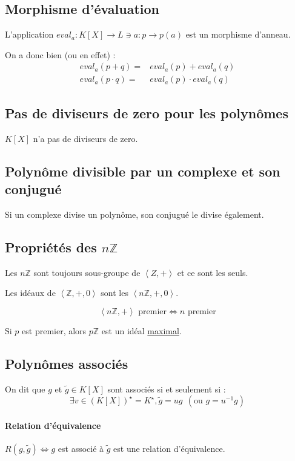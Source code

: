 \documentclass[a4paper,10pt]{article}
\newcommand{\ap}{ \rightarrow} %
\newcommand{\mt}[1]{\widetilde{ #1 }} %
\newcommand{\grp}[1]{\left\langle #1 \right\rangle} %
\newcommand{\ioi}{\Leftrightarrow} %
\newcommand{\ZZ}{\mathbb{Z}} %
\begin{document}
 \subsection{Morphisme d'évaluation}
  L'application $eval_a : K[X] \ap L \ni a : p \ap p(a)$ est un morphisme d'anneau.
  
  On a donc bien (ou en effet) : 
  \begin{eqnarray*}
   eval_a(p+q)=&eval_a(p)+eval_a(q)\\
   eval_a(p\cdot q)=&eval_a(p)\cdot eval_a(q)
   \end{eqnarray*}

 \subsection{Pas de diviseurs de zero pour les polynômes}
  $K[X]$ n'a pas de diviseurs de zero.

 \subsection{Polynôme divisible par un complexe et son conjugué}
   Si un complexe divise un polynôme, son conjugué le divise également.

 \subsection{Propriétés des $n\ZZ$}
  Les $n\ZZ$ sont toujours sous-groupe de $\grp{Z,+}$ et ce sont les seuls.
  
  Les idéaux de $\grp{\ZZ,+,0}$ sont les $\grp{n\ZZ,+,0}$.

  $$\grp{n\ZZ,+} \mbox{ premier} \ioi n \mbox{ premier}$$

  Si $p$ est premier, alors $p\ZZ$ est un idéal \underline{maximal}. 

 \subsection{Polynômes associés}
  On dit que $g$ et $\mt{g} \in K[X]$ sont associés si et seulement si :
  $$\exists v\in (K[X])^\star = K^\star, \mt{g} = ug~ ~(\mbox{ou } g=u^{-1}g)$$

  \paragraph{Relation d'équivalence}
   $R(g,\mt{g}) \ioi g$ est associé à
   $\mt{g}$ est une relation d'équivalence.
 
\end{document}
